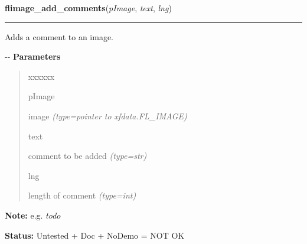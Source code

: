 \hspace{.8\funcindent}\begin{boxedminipage}{\funcwidth}

    \raggedright \textbf{flimage\_add\_comments}(\textit{pImage}, \textit{text}, \textit{lng})

    \vspace{-1.5ex}

    \rule{\textwidth}{0.5\fboxrule}
\setlength{\parskip}{2ex}

Adds a comment to an image.

-{}-
\setlength{\parskip}{1ex}
      \textbf{Parameters}
      \vspace{-1ex}

      \begin{quote}
        \begin{Ventry}{xxxxxx}

          \item[pImage]


image
            {\it (type=pointer to xfdata.FL\_IMAGE)}

          \item[text]


comment to be added
            {\it (type=str)}

          \item[lng]


length of comment
            {\it (type=int)}

        \end{Ventry}

      \end{quote}

\textbf{Note:} 
e.g. \emph{todo}


\textbf{Status:} 
Untested + Doc + NoDemo = NOT OK


    \end{boxedminipage}

    \label{xformslib:flflimage:flimage_color_to_pixel}

    \vspace{0.5ex}

